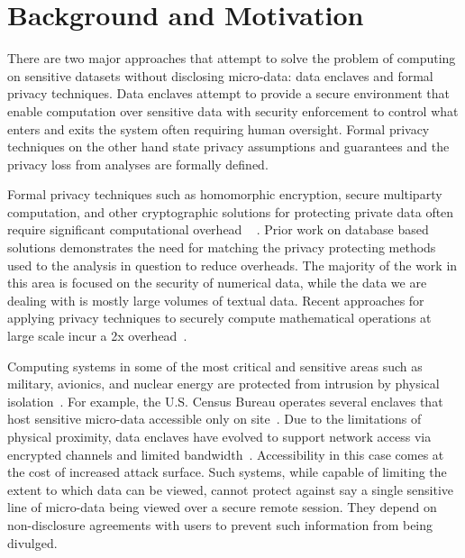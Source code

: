 \section{Background and Motivation} \label{sec:background}

There are two major approaches that attempt to solve the problem of computing on sensitive
datasets without disclosing micro-data: data enclaves and formal privacy techniques. Data enclaves attempt to
provide a secure environment that enable computation over sensitive data with security enforcement
to control what enters and exits the system often requiring human oversight. Formal privacy
techniques on the other hand state privacy assumptions and guarantees and the privacy loss
from analyses are formally defined.

Formal privacy techniques such as homomorphic encryption, secure multiparty computation, and
other cryptographic solutions for protecting private data often require significant computational
overhead ~\cite{gentry2012fully} \cite{naehrig2011can}. Prior work on database based solutions \cite{popa2011cryptdb}
demonstrates the need for matching the privacy protecting methods used to the analysis in question
to reduce overheads. The majority of the work in this area is focused on the security of
numerical data, while the data we are dealing with is mostly large volumes of textual data.
Recent approaches for applying privacy techniques to securely compute
mathematical operations at large scale incur a 2x overhead~\cite{kepner2014computing}.

Computing systems in some of the most critical and sensitive areas such as military, avionics,
and nuclear energy are protected from intrusion by physical isolation~\cite{byres2013air, ross2013security}.
For example, the U.S. Census Bureau operates several enclaves that host sensitive micro-data accessible
only on site~\cite{rdc_uscensus}. Due to the limitations of physical proximity, data enclaves
have evolved to support network access via encrypted channels and limited bandwidth~\cite{lane2008using, grossman2016toward}.
Accessibility in this case comes at the cost of increased attack surface. Such systems, while
capable of limiting the extent to which data can be viewed, cannot protect against say a single
sensitive line of micro-data being viewed over a secure remote session. They depend on non-disclosure
agreements with users to prevent such information from being divulged.

